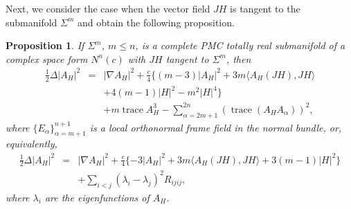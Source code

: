 \documentclass[11pt]{amsart}
\theoremstyle{plain}
\newtheorem{proposition}  [theorem]  {Proposition}
\theoremstyle{definition}
\DeclareMathOperator{\trace}{trace} \DeclareMathOperator{\di}{div}
\numberwithin{equation}{section}
\begin{document}
Next, we consider the case when the vector field $JH$ is tangent to the submanifold $\Sigma^m$ and obtain the following proposition.

\begin{proposition}\label{p:tot2} If $\Sigma^m$, $m\leq n$, is a complete PMC totally real submanifold of a complex space form $N^n(c)$ with $JH$ tangent to $\Sigma^m$, then
\begin{eqnarray}\label{eq:delta_tot_2_2}
\frac{1}{2}\Delta|A_H|^2&=&|\nabla A_H|^2+\frac{c}{4}\{(m-3)|A_H|^2+3m\langle A_H(JH),JH\rangle\\\nonumber&&+4(m-1)|H|^2-m^2|H|^4\}\\\nonumber&&+m\trace A_H^3-\sum_{\alpha=2m+1}^{2n}(\trace(A_HA_{\alpha}))^2,
\end{eqnarray}
where $\{E_{\alpha}\}_{\alpha=m+1}^{n+1}$ is a local orthonormal frame field in the normal bundle, or, equivalently,
\begin{eqnarray}\label{eq:delta_tot_1_2}
\frac{1}{2}\Delta|A_H|^2&=&|\nabla A_H|^2+\frac{c}{4}\{-3|A_H|^2+3m\langle A_H(JH),JH\rangle+3(m-1)|H|^2\}\\\nonumber&&+\sum_{i<j}(\lambda_i-\lambda_j)^2R_{ijij},
\end{eqnarray}
where $\lambda_i$ are the eigenfunctions of $A_H$.
\end{proposition}
\end{document}
